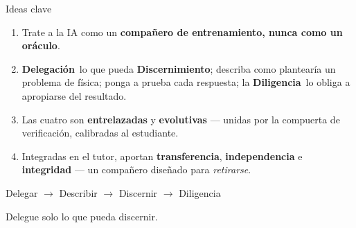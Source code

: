 \documentclass[aspectratio=169,11pt]{beamer}
\newcommand{\Del}{\textcolor{Cdel}{\textbf{Delegación}}}
\newcommand{\Dis}{\textcolor{Cdis}{\textbf{Discernimiento}}}
\newcommand{\Dil}{\textcolor{Cdil}{\textbf{Diligencia}}}
\begin{document}
\begin{frame}{Ideas clave}
  \begin{enumerate}\setlength\itemsep{0.5em}
    \item Trate a la IA como un \textbf{compañero de entrenamiento, nunca como un
          oráculo}.
    \item \Del\ lo que pueda \Dis; describa como plantearía un problema de física;
          ponga a prueba cada respuesta; la \Dil\ lo obliga a apropiarse del resultado.
    \item Las cuatro son \textbf{entrelazadas} y \textbf{evolutivas} --- unidas por la
          compuerta de verificación, calibradas al estudiante.
    \item Integradas en el tutor, aportan \textbf{transferencia}, \textbf{independencia}
          e \textbf{integridad} --- un compañero diseñado para \emph{retirarse}.
  \end{enumerate}
  \vspace{0.8em}
  \begin{center}\Large
    \textcolor{Cdel}{Delegar} $\to$ \textcolor{Cdes}{Describir} $\to$
    \textcolor{Cdis}{Discernir} $\to$ \textcolor{Cdil}{Diligencia}
  \end{center}
\end{frame}

\begin{frame}[standout]
  Delegue solo lo que pueda discernir.
\end{frame}
\end{document}
